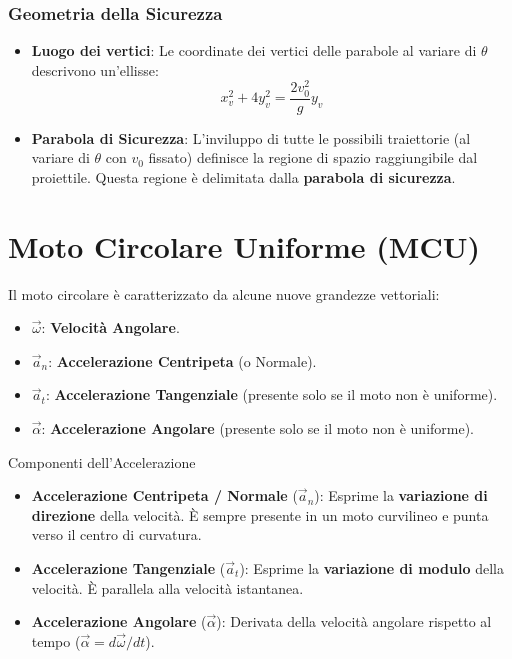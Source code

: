 \subsubsection{Geometria della Sicurezza}
\begin{itemize}
    \item \textbf{Luogo dei vertici}: Le coordinate dei vertici delle parabole al variare di $\theta$ descrivono un'ellisse:
    \begin{equation}
    x_v^2 + 4y_v^2 = \frac{2v_0^2}{g} y_v
\end{equation}
    \item \textbf{Parabola di Sicurezza}: L'inviluppo di tutte le possibili traiettorie (al variare di $\theta$ con $v_0$ fissato) definisce la regione di spazio raggiungibile dal proiettile. Questa regione è delimitata dalla \textbf{parabola di sicurezza}.
\end{itemize}

\section{Moto Circolare Uniforme (MCU)}
Il moto circolare è caratterizzato da alcune nuove grandezze vettoriali:
\begin{itemize}
    \item $\vec{\omega}$: \textbf{Velocità Angolare}.
    \item $\vec{a}_n$: \textbf{Accelerazione Centripeta} (o Normale).
    \item $\vec{a}_t$: \textbf{Accelerazione Tangenziale} (presente solo se il moto non è uniforme).
    \item $\vec{\alpha}$: \textbf{Accelerazione Angolare} (presente solo se il moto non è uniforme).
\end{itemize}

\begin{definizione}{Componenti dell'Accelerazione}
\begin{itemize}
    \item \textbf{Accelerazione Centripeta / Normale} ($\vec{a}_n$): Esprime la \textbf{variazione di direzione} della velocità. È sempre presente in un moto curvilineo e punta verso il centro di curvatura.
    \item \textbf{Accelerazione Tangenziale} ($\vec{a}_t$): Esprime la \textbf{variazione di modulo} della velocità. È parallela alla velocità istantanea.
    \item \textbf{Accelerazione Angolare} ($\vec{\alpha}$): Derivata della velocità angolare rispetto al tempo ($\vec{\alpha} = d\vec{\omega}/dt$).
\end{itemize}
\end{definizione}

